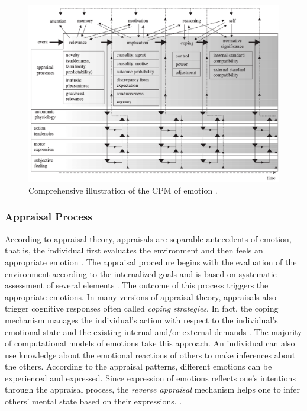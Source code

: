 \documentclass[12pt]{report}
\begin{document}
\begin{figure}[tbh]
  \center
  \includegraphics[width=\textwidth]{figure/comprehensive-CPM.png}
  \caption{Comprehensive illustration of the CPM of emotion
  \cite{scherer:dynamic-architecture-emotion,scherer:appraisal-processes}.}
  \label{fig:comp-cpm}
\end{figure}

\subsubsection{Appraisal Process}
\label{sec:appraisal-process}

According to appraisal theory, appraisals are separable antecedents of emotion,
that is, the individual first evaluates the environment and then feels an
appropriate emotion \cite{scherer:appraisal-processes}. The appraisal procedure
begins with the evaluation of the environment according to the internalized
goals and is based on systematic assessment of several elements
\cite{scherer:sequential-appraisal-process}. The outcome of this process
triggers the appropriate emotions. In many versions of appraisal theory,
appraisals also trigger cognitive responses often called \textit{coping
strategies}. In fact, the coping mechanism manages the individual's action with
respect to the individual's emotional state and the existing internal and/or
external demands \cite{folkman:coping-pitfalls-promise}. The majority of
computational models of emotions take this approach. An individual can also use
knowledge about the emotional reactions of others to make inferences about the
others. According to the appraisal patterns, different emotions can be
experienced and expressed. Since expression of emotions reflects one's
intentions through the appraisal process, the \textit{reverse appraisal}
mechanism helps one to infer others' mental state based on their expressions.
\cite{gratch:reverse-appraisal, hareli:emotional-reaction-perception}.
\end{document}
